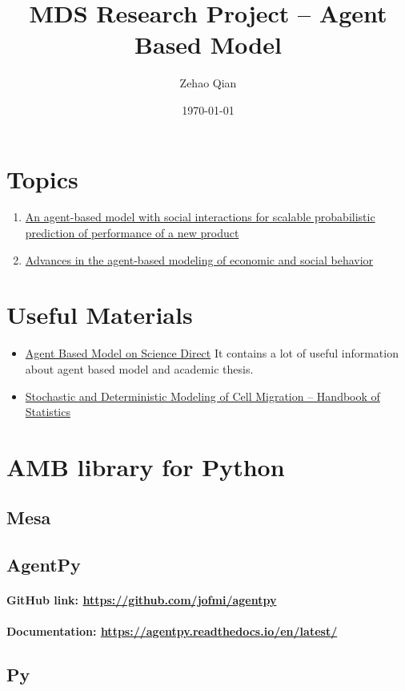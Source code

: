 \documentclass{article}
\begin{document}
% 
% 
\title{MDS Research Project -- Agent Based Model}
\author{Zehao Qian}
\date{\today}
\maketitle
% 
\section{Topics}
\begin{enumerate}
    \item \href{https://www.sciencedirect.com/science/article/pii/S2667096822000702}{An agent-based model with social interactions for scalable probabilistic prediction of performance of a new product}
    \item \href{https://link.springer.com/article/10.1007/s43546-021-00103-3}{Advances in the agent-based modeling of economic and social behavior}
\end{enumerate}
%
\section{Useful Materials}
% 
% 
\begin{itemize}
    \item \href{https://www.sciencedirect.com/topics/mathematics/agent-based-model}{Agent Based Model on Science Direct} It contains a lot of useful information about agent based model and academic thesis.
    \item \href{https://www.sciencedirect.com/science/article/abs/pii/S0169716118300075}{Stochastic and Deterministic Modeling of Cell Migration -- Handbook of Statistics}
\end{itemize}
% 
% 
% 
% 
% 
% 
% 
% 
% 
% 
% 
% 
\section{AMB library for Python}
% 
% 
% 
\subsection{Mesa}
% 
% 
% 
% 
% 
% 
\subsection{AgentPy}
\paragraph{GitHub link: \href{https://github.com/jofmi/agentpy}{https://github.com/jofmi/agentpy}}
\paragraph{Documentation: \href{https://agentpy.readthedocs.io/en/latest/}{https://agentpy.readthedocs.io/en/latest/}}
% 
% 
% 
% 
\subsection{Py}
% 
% 
% 
% 
% 
\end{document}
